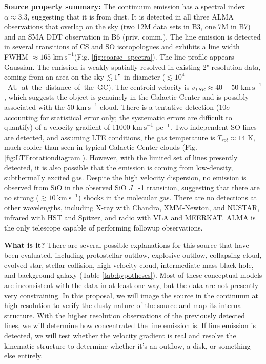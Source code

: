 \documentclass[12pt,a4paper]{article}  %
\newcommand{\kms}{\ensuremath{\mathrm{km~s}^{-1}}\xspace}
\begin{document}
\textbf{Source property summary:}
The continuum emission has a spectral index $\alpha\approx3.3$, suggesting that it is from dust.
It is detected in all three ALMA observations that overlap on the sky (two 12M data sets in B3, one 7M in B7) and an SMA DDT observation in B6 (priv. comm.).
The line emission is detected in several transitions of CS and SO isotopologues and exhibits a line width FWHM $\approx165$ \kms (Fig. \ref{fig:coarse_spectra}).  The line profile appears Gaussian.
The emission is weakly spatially resolved in existing 2" resolution data, coming from an area on the sky $\lesssim1"$ in diameter \mbox{($\lesssim10^4$ AU at the distance of the GC).}
The centroid velocity is $v_{LSR}\approx40-50$ \kms, which suggests the object is genuinely in the Galactic Center and is possibly associated with the 50 \kms cloud.
There is a tentative detection (10$\sigma$ accounting for statistical error only; the systematic errors are difficult to quantify) of a velocity gradient of 11000 \kms pc$^{-1}$.
Two independent SO lines are detected, and assuming LTE conditions, the gas temperature is $T_{rot}\approx 14$ K, much colder than seen in typical Galactic Center clouds (Fig. \ref{fig:LTErotationdiagram}).
However, with the limited set of lines presently detected, it is also possible that the emission is coming from low-density, subthermally excited gas.
Despite the high velocity dispersion, no emission is observed from SiO in the observed SiO $J$\;=-1 transition, suggesting that there are no strong ($\gtrsim10~\kms$) shocks in the molecular gas.
There are no detections at other wavelengths, including X-ray with Chandra, XMM-Newton, and NUSTAR, infrared with HST and Spitzer, and radio with VLA and MEERKAT.
ALMA is the only telescope capable of performing followup observations.


\textbf{What is it?}
There are several possible explanations for this source that have been evaluated, including protostellar outflow, explosive outflow, collapsing cloud, evolved star, stellar collision, high-velocity cloud, intermediate mass black hole, and background galaxy (Table \ref{tab:hypotheses})\citep{Ginsburg2024}.
Most of these conceptual models are inconsistent with the data in at least one way, but the data are not presently very constraining.
In this proposal, we will image the source in the continuum at high resolution to verify the dusty nature of the source and map its internal structure.
With the higher resolution observations of the previously detected lines, we will determine how concentrated the line emission is.  
If line emission is detected, we will test whether the velocity gradient is real and resolve the kinematic structure to determine whether it's an outflow, a disk, or something else entirely.
\end{document}
